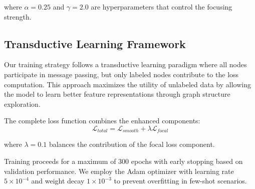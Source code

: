 where $\alpha = 0.25$ and $\gamma = 2.0$ are hyperparameters that control the focusing strength.

\subsection{Transductive Learning Framework}

Our training strategy follows a transductive learning paradigm where all nodes participate in message passing, but only labeled nodes contribute to the loss computation. This approach maximizes the utility of unlabeled data by allowing the model to learn better feature representations through graph structure exploration.

The complete loss function combines the enhanced components:
\begin{equation}
\mathcal{L}_{total} = \mathcal{L}_{smooth} + \lambda \mathcal{L}_{focal}
\end{equation}

where $\lambda = 0.1$ balances the contribution of the focal loss component.

Training proceeds for a maximum of 300 epochs with early stopping based on validation performance. We employ the Adam optimizer with learning rate $5 \times 10^{-4}$ and weight decay $1 \times 10^{-3}$ to prevent overfitting in few-shot scenarios.

\EndChapter
